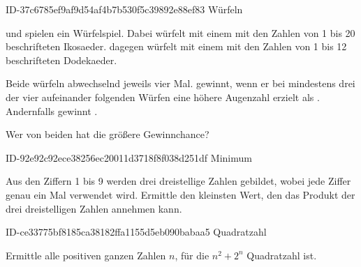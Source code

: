 \begin{exercise}
      {ID-37c6785ef9af9d54af4b7b530f5c39892e88ef83}
      {Würfeln}
  \ifproblem\problem\par
    \xya{} und \xyb{} spielen ein Würfelspiel.
    Dabei würfelt \xya{} mit einem mit den Zahlen
    von 1 bis 20 beschrifteten Ikosaeder.
    \xyb{} dagegen würfelt mit einem mit den Zahlen
    von 1 bis 12 beschrifteten Dodekaeder.
    \par
    Beide würfeln abwechselnd jeweils vier Mal.
    \xya{} gewinnt, wenn er bei mindestens drei
    der vier aufeinander folgenden Würfen eine
    höhere Augenzahl erzielt als \xyb. Andernfalls
    gewinnt \xyb.
    \par
    Wer von beiden hat die größere Gewinnchance?
  \fi
\end{exercise}

\begin{exercise}
      {ID-92e92c92ece38256ec20011d3718f8f038d251df}
      {Minimum}
  \ifproblem\problem\par
    Aus den Ziffern 1 bis 9 werden drei dreistellige
    Zahlen gebildet, wobei jede Ziffer genau ein Mal
    verwendet wird. Ermittle den kleinsten Wert,
    den das Produkt der drei dreistelligen Zahlen
    annehmen kann.
  \fi
\end{exercise}

\begin{exercise}
      {ID-ce33775bf8185ca38182ffa1155d5eb090babaa5}
      {Quadratzahl}
  \ifproblem\problem\par
    Ermittle alle positiven ganzen Zahlen $n$, für die
    $n^{2}+2^{n}$ Quadratzahl ist.
  \fi
\end{exercise}

